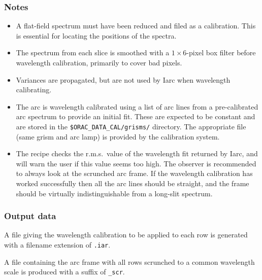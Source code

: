 \documentclass[twoside,11pt,nolof]{starlink}
\begin{document}
\subsubsection*{Notes}\begin{itemize}

\item

A flat-field spectrum must have been reduced and filed as a calibration.
This is essential for locating the positions of the spectra.

\item

The spectrum from each slice is smoothed with a $1 \times 6$-pixel box
filter before wavelength calibration, primarily to cover bad pixels.

\item

Variances are propagated, but are not used by Iarc when wavelength
calibrating.

\item

The arc is wavelength calibrated using a list of arc lines from a
pre-calibrated arc spectrum to provide an initial fit. These are
expected to be constant and are stored in the \texttt{\$ORAC\_DATA\_CAL/grisms/}
directory. The appropriate file (same grism and arc lamp) is provided
by the calibration system.

\item

The recipe checks the r.m.s.\ value of the wavelength fit returned by
Iarc, and will warn the user if this value seems too high. The
observer is recommended to always look at the scrunched arc frame. If
the wavelength calibration has worked successfully then all the arc
lines should be straight, and the frame should be virtually
indistinguishable from a long-slit spectrum.


\end{itemize}

\subsubsection*{Output data}

A file giving the wavelength calibration to be applied to each row is
generated with a filename extension of \texttt{.iar}.

A file containing the arc frame with all rows scrunched to a common
wavelength scale is produced with a suffix of \texttt{\_scr}.
\end{document}
